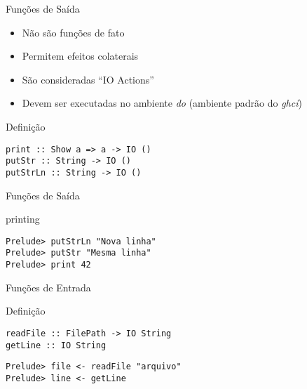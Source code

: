 \documentclass{beamer}
\begin{document}
		\begin{frame}[fragile]{Funções de Saída}
		 \begin{itemize}
		  \item Não são funções de fato
		  \item Permitem efeitos colaterais
		  \item São consideradas ``IO Actions''
		  \item Devem ser executadas no ambiente \textit{do} (ambiente padrão do \textit{ghci})
		 \end{itemize}
		 
		 \begin{block}{Definição}
		  \begin{lstlisting}
print :: Show a => a -> IO ()
putStr :: String -> IO ()
putStrLn :: String -> IO ()
		  \end{lstlisting}
		 \end{block}
		\end{frame}
		
		\begin{frame}[fragile]{Funções de Saída}
		 \begin{block}{printing}
		  \begin{lstlisting}
Prelude> putStrLn "Nova linha"
Prelude> putStr "Mesma linha"
Prelude> print 42
		  \end{lstlisting}
		 \end{block}
		\end{frame}
		
		\begin{frame}[fragile]{Funções de Entrada}

		 \begin{block}{Definição}
		  \begin{lstlisting}
readFile :: FilePath -> IO String
getLine :: IO String
		  \end{lstlisting}
		 \end{block}
		 
		 \begin{block}{}
		  \begin{lstlisting}
Prelude> file <- readFile "arquivo"
Prelude> line <- getLine
		  \end{lstlisting}
		 \end{block}		 
		\end{frame}
\end{document}
